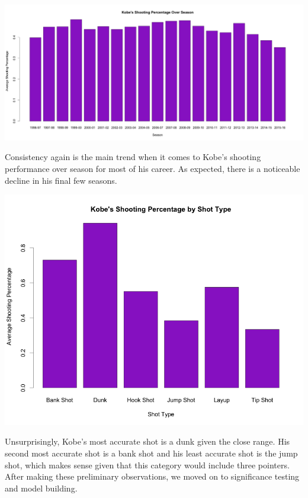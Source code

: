 \documentclass[paper=a4, fontsize=11pt]{scrartcl} %
\numberwithin{equation}{section} %
\numberwithin{figure}{section} %
\numberwithin{table}{section} %
\begin{document}
\begin{center}
	\includegraphics[width=19cm]{img/season}
\end{center}
Consistency again is the main trend when it comes to Kobe's shooting performance over season for most of his career. As expected, there is a noticeable decline in his final few seasons.
\begin{center}
	\includegraphics[width=14cm]{img/type}
\end{center}
Unsurprisingly, Kobe's most accurate shot is a dunk given the close range. His second most accurate shot is a bank shot and his least accurate shot is the jump shot, which makes sense given that this category would include three pointers.\\

After making these preliminary observations, we moved on to significance testing and model building.
\end{document}
